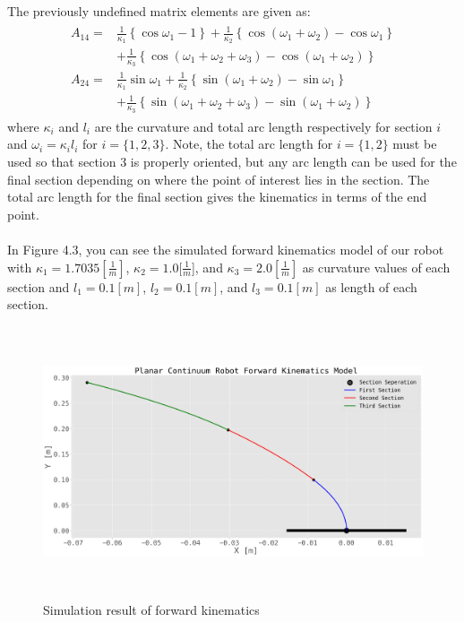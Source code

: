 \documentclass[12pt,twoside,a4]{mwbk}
\begin{document}
The previously undefined matrix elements are given as:
\begin{subequations}
\begin{align}
\begin{aligned}
A_{14}=& \frac{1}{\kappa_{1}}\left\{\cos \omega_{1}-1\right\}+\frac{1}{\kappa_{2}}\left\{\cos \left(\omega_{1}+\omega_{2}\right)-\cos \omega_{1}\right\} \\
&+\frac{1}{\kappa_{3}}\left\{\cos \left(\omega_{1}+\omega_{2}+\omega_{3}\right)-\cos \left(\omega_{1}+\omega_{2}\right)\right\} \\
A_{24}=& \frac{1}{\kappa_{1}} \sin \omega_{1}+\frac{1}{\kappa_{2}}\left\{\sin \left(\omega_{1}+\omega_{2}\right)-\sin \omega_{1}\right\} \\
&+\frac{1}{\kappa_{3}}\left\{\sin \left(\omega_{1}+\omega_{2}+\omega_{3}\right)-\sin \left(\omega_{1}+\omega_{2}\right)\right\}
\end{aligned}
\end{align}
\end{subequations}
where $\kappa_{i}$ and $l_{i}$ are the curvature and total arc length respectively for section $i$ and $\omega_{i}=\kappa_{i} l_{i}$ for $i=\{1,2,3\}$. Note, the total arc length for $i=\{1,2\}$ must be used so that section 3 is properly oriented, but any arc length can be used for the final section depending on where the point of interest lies in the section. The total arc length for the final section gives the kinematics in terms of the end point.
\\ \\
In Figure 4.3, you can see the simulated forward kinematics model of our robot with $\kappa_1 = 1.7035 [\frac{1}{m}]$, $\kappa_2 = 1.0 [\frac{1}{m}$], and $\kappa_3 = 2.0 [\frac{1}{m}]$ as curvature values of each section and $l_1 = 0.1 [m]$, $l_2 = 0.1 [m]$, and $l_3 = 0.1 [m]$ as length of each section. 
\newpage
\begin{figure}[h]
    \centering
    \includegraphics[width=16.0cm, height=8cm]{forward.png}
    \caption{Simulation result of forward kinematics}
\end{figure}
\end{document}
